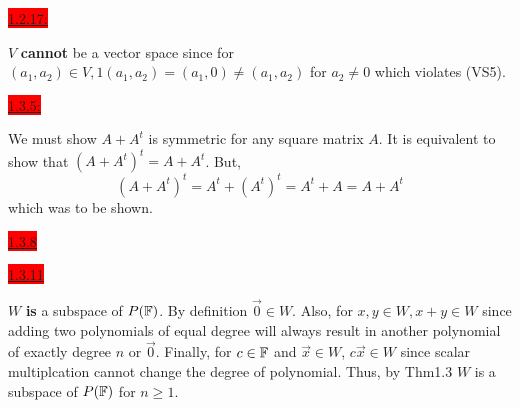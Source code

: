 \documentclass{exam}
\begin{document}
  \colorbox{red}{\underline{1.2.17:}}
  \begin{solution}
    $V$ \textbf{cannot} be a vector space since for $(a_1, a_2) \in V, 1(a_1, a_2) = (a_1, 0) \neq (a_1, a_2)$ for $a_2 \neq 0$ which violates (VS5).
  \end{solution}

  \colorbox{red}{\underline{1.3.5:}}
  \begin{solution}
    We must show $A + A^t$ is symmetric for any square matrix $A$. It is equivalent to show that $(A + A^{t})^{t} = A + A^{t}$. But, 
    \[
      (A + A^{t})^t =  A^{t} + (A^{t})^{t} = A^{t} + A = A + A^{t}
    \]
    which was to be shown.
  \end{solution}

  \colorbox{red}{\underline{1.3.8}}
  \begin{solution}
  \end{solution}

  \newpage

  \colorbox{red}{\underline{1.3.11}}
  \begin{solution}
    $W$ \textbf{is} a subspace of $P(\mathbb F)$. By definition $\vec{0} \in W$. Also, for $x, y \in W, x + y \in W$ since adding two polynomials of equal degree will always result in another polynomial of exactly degree $n$ or $\vec{0}$. Finally, for $c \in \mathbb F$ and $\vec{x} \in W$, $c\vec{x} \in W$ since scalar multiplcation cannot change the degree of polynomial. Thus, by Thm1.3 $W$ is a subspace of $P(\mathbb F)$ for $n \geq 1$.
  \end{solution}

\end{document}
